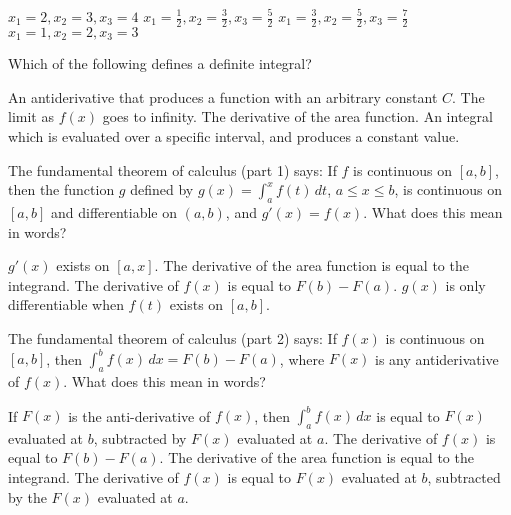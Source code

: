 \documentclass[addpoints, 12pt]{exam}%
\begin{document}
\begin{questions}
\begin{multicols}{2}
\begin{choices}
\choice $x_1 = 2, x_2 = 3, x_3 = 4$
\choice $x_1 = \frac{1}{2}, x_2 = \frac{3}{2}, x_3 = \frac{5}{2}$
\CorrectChoice $x_1 = \frac{3}{2}, x_2 = \frac{5}{2}, x_3 = \frac{7}{2}$
\choice $x_1 = 1, x_2 = 2, x_3 = 3$
\end{choices}
\end{multicols}


\question[1]

Which of the following defines a definite integral?

\begin{multicols}{2}
\begin{choices}
\choice An antiderivative that produces a function with an arbitrary constant $C$.
\choice The limit as $f(x)$ goes to infinity.
\choice The derivative of the area function.
\CorrectChoice An integral which is evaluated over a specific interval, and produces a constant value.
\end{choices}
\end{multicols}


\question[1]
The fundamental theorem of calculus (part 1) says: If $f$ is continuous on $[a, b]$, then the function $g$ defined by $g(x) = \int_{a}^{x} f(t) \,dt$, $a \leq x \leq b$, is continuous on $[a, b]$ and differentiable on $(a, b)$, and $g'(x) = f(x).$
What does this mean in words?

\begin{multicols}{2}
\begin{choices}
\choice $g'(x)$ exists on $[a, x]$.
\CorrectChoice The derivative of the area function is equal to the integrand.
\choice The derivative of $f(x)$ is equal to $F(b) - F(a)$.
\choice $g(x)$ is only differentiable when $f(t)$ exists on $[a, b]$.
\end{choices}
\end{multicols}

\newpage

\question[1]

The fundamental theorem of calculus (part 2) says: If $f(x)$ is continuous on $[a, b]$, then $\int_{a}^{b} f(x) \,dx = F(b) - F(a)$, where $F(x)$ is any antiderivative of $f(x)$.
What does this mean in words?

\begin{choices}
\CorrectChoice If $F(x)$ is the anti-derivative of $f(x)$, then $\int_{a}^{b} f(x) \,dx$ is equal to $F(x)$ evaluated at $b$, subtracted by $F(x)$ evaluated at $a$.
\choice The derivative of $f(x)$ is equal to $F(b) - F(a)$.
\choice The derivative of the area function is equal to the integrand.
\choice The derivative of $f(x)$ is equal to $F(x)$ evaluated at $b$, subtracted by the $F(x)$ evaluated at $a$.
\end{choices}


\end{questions}
\end{document}
